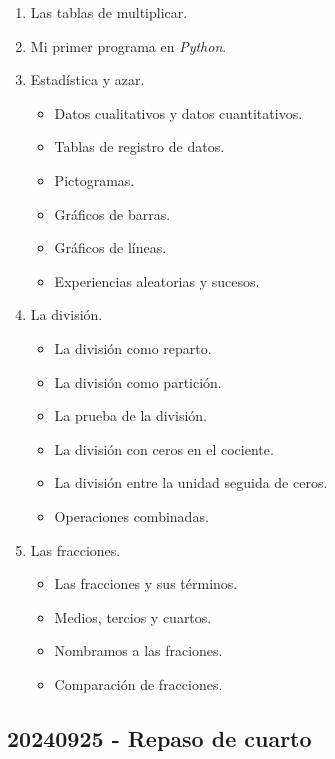 \documentclass[a4paper,12pt]{article}
\begin{document}
\begin{enumerate}
    \item Las tablas de multiplicar.
    \item Mi primer programa en \textit{Python}.
    \item Estadística y azar.
    \begin{itemize}
        \item Datos cualitativos y datos cuantitativos.
        \item Tablas de registro de datos.
        \item Pictogramas.
        \item Gráficos de barras.
        \item Gráficos de líneas.
        \item Experiencias aleatorias y sucesos.
    \end{itemize}
    \item La división.
    \begin{itemize}
        \item La división como reparto.
        \item La división como partición.
        \item La prueba de la división.
        \item La división con ceros en el cociente.
        \item La división entre la unidad seguida de ceros.
        \item Operaciones combinadas.
    \end{itemize}
    \item Las fracciones.
    \begin{itemize}
        \item Las fracciones y sus términos.
        \item Medios, tercios y cuartos.
        \item Nombramos a las fraciones.
        \item Comparación de fracciones.
    \end{itemize}
\end{enumerate}

\subsection{20240925 - Repaso de cuarto}
\end{document}
